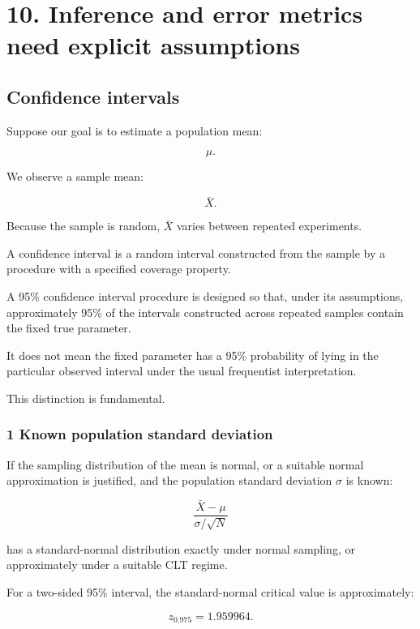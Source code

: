 \section{10. Inference and error metrics need explicit assumptions}\label{02-foundations-ii-ch030-inference-and-error-metrics-need-explicit-assumptions}

\subsection{Confidence intervals}\label{02-foundations-ii-ch030-confidence-intervals}

Suppose our goal is to estimate a population mean:

\[
 \mu.
\]

We observe a sample mean:

\[
 \bar X.
\]

Because the sample is random, \(\bar X\) varies between repeated experiments.

A confidence interval is a random interval constructed from the sample by a procedure with a specified coverage property.

A 95\% confidence interval procedure is designed so that, under its assumptions, approximately 95\% of the intervals constructed across repeated samples contain the fixed true parameter.

It does not mean the fixed parameter has a 95\% probability of lying in the particular observed interval under the usual frequentist interpretation.

This distinction is fundamental.

\subsubsection{1 Known population standard deviation}\label{02-foundations-ii-ch030-known-population-standard-deviation}

If the sampling distribution of the mean is normal, or a suitable normal approximation is justified, and the population standard deviation \(\sigma\) is known:

\[
 \frac{\bar X-\mu}{\sigma/\sqrt N}
\]

has a standard-normal distribution exactly under normal sampling, or approximately under a suitable CLT regime.

For a two-sided 95\% interval, the standard-normal critical value is approximately:

\[
 z_{0.975}=1.959964.
\]

